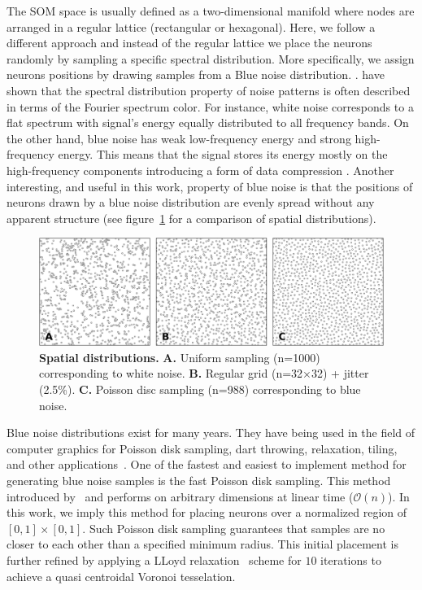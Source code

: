 The SOM space is usually defined as a two-dimensional manifold where nodes are
arranged in a regular lattice (rectangular or hexagonal). Here, we follow a 
different approach and instead of the regular lattice we place the neurons
randomly by sampling a specific spectral distribution. More specifically, we
assign neurons positions by drawing samples from a Blue noise distribution. 
\citet{Zhou:2012}. have shown that the spectral distribution
property of noise patterns is often described in terms of the Fourier spectrum
color. For instance, white noise corresponds to a flat spectrum with signal's
energy equally distributed to all frequency bands. On the other hand, blue 
noise has weak low-frequency energy and strong high-frequency energy. This
means that the signal stores its energy mostly on the high-frequency
components introducing a form of data compression .
Another interesting, and useful in this work, property of blue noise is that 
the positions of neurons drawn by a blue noise distribution are 
evenly spread without any apparent structure (see figure~\ref{fig:sampling}
for a comparison of spatial distributions).
\begin{figure}[htbp]
  \includegraphics[width=\textwidth]{figures/blue-noise.pdf}
  \caption{\textbf{Spatial distributions.}
    \textbf{\textsf{A.}} Uniform sampling (n=1000) corresponding to white noise.
    \textbf{\textsf{B.}} Regular grid (n=32$\times$32) + jitter (2.5\%).
    \textbf{\textsf{C.}} Poisson disc sampling (n=988) corresponding to blue noise.}
  \label{fig:sampling}
\end{figure}

Blue noise distributions exist for many years. They have being used in the
field of computer graphics for Poisson disk sampling, dart throwing, relaxation,
tiling, and other applications~\citep{Lagae:2008}. One of the fastest
and easiest to implement method for generating blue noise samples is the 
fast Poisson disk sampling. This method introduced by~\citep{Bridson:2007} 
and performs on arbitrary dimensions at linear time ($\mathcal{O}(n)$).
In this work, we imply this method for placing neurons over a normalized 
region of $[0,1]\times[0,1]$. Such Poisson disk sampling guarantees that 
samples are no closer to each other than a specified minimum radius. This
initial placement is further refined by applying a LLoyd relaxation~\citep{Lloyd:1982}
scheme for $10$ iterations to achieve a quasi centroidal Voronoi tesselation.

